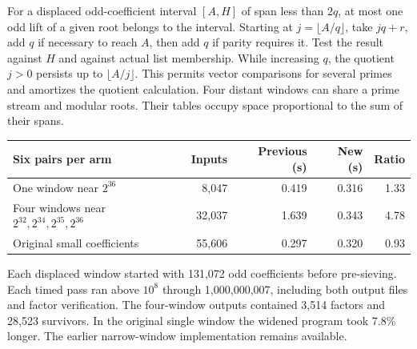 \documentclass[11pt,a4paper,oneside,openany]{report}
\begin{document}
For a displaced odd-coefficient interval $[A,H]$ of span less than $2q$, at most one odd lift of a given root belongs to the interval. Starting at $j=\lfloor A/q\rfloor$, take $jq+r$, add $q$ if necessary to reach $A$, then add $q$ if parity requires it. Test the result against $H$ and against actual list membership. While increasing $q$, the quotient $j>0$ persists up to $\lfloor A/j\rfloor$. This permits vector comparisons for several primes and amortizes the quotient calculation. Four distant windows can share a prime stream and modular roots. Their tables occupy space proportional to the sum of their spans.

\begin{center}\small
\begin{tabular}{@{}lrrrr@{}}\toprule
Six pairs per arm & Inputs & Previous (s)& New (s)& Ratio\\\midrule
One window near $2^{36}$ &8,047&0.419&0.316&1.33\\
Four windows near $2^{32},2^{34},2^{35},2^{36}$ &32,037&1.639&0.343&4.78\\
Original small coefficients &55,606&0.297&0.320&0.93\\\bottomrule
\end{tabular}
\end{center}
Each displaced window started with 131,072 odd coefficients before pre-sieving. Each timed pass ran above $10^8$ through 1,000,000,007, including both output files and factor verification. The four-window outputs contained 3,514 factors and 28,523 survivors. In the original single window the widened program took 7.8\% longer. The earlier narrow-window implementation remains available.
\end{document}
